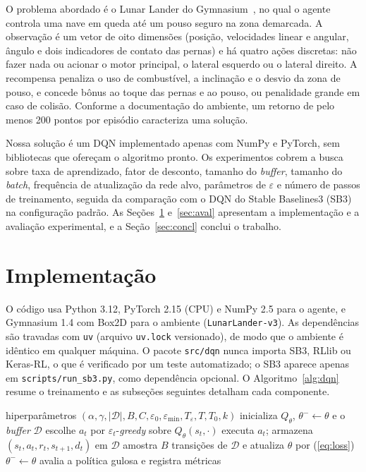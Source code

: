\documentclass[conference]{IEEEtran}
\begin{document}
O problema abordado é o Lunar Lander do Gymnasium~\cite{gymnasium}, no qual o agente controla uma nave em queda até um pouso seguro na zona demarcada. A observação é um vetor de oito dimensões (posição, velocidades linear e angular, ângulo e dois indicadores de contato das pernas) e há quatro ações discretas: não fazer nada ou acionar o motor principal, o lateral esquerdo ou o lateral direito. A recompensa penaliza o uso de combustível, a inclinação e o desvio da zona de pouso, e concede bônus ao toque das pernas e ao pouso, ou penalidade grande em caso de colisão. Conforme a documentação do ambiente, um retorno de pelo menos 200 pontos por episódio caracteriza uma solução.

Nossa solução é um DQN implementado apenas com NumPy e PyTorch, sem bibliotecas que ofereçam o algoritmo pronto. Os experimentos cobrem a busca sobre taxa de aprendizado, fator de desconto, tamanho do \textit{buffer}, tamanho do \textit{batch}, frequência de atualização da rede alvo, parâmetros de $\varepsilon$ e número de passos de treinamento, seguida da comparação com o DQN do Stable Baselines3 (SB3)~\cite{sb3} na configuração padrão. As Seções~\ref{sec:impl} e~\ref{sec:aval} apresentam a implementação e a avaliação experimental, e a Seção~\ref{sec:concl} conclui o trabalho.

\section{Implementação}
\label{sec:impl}
O código usa Python 3.12, PyTorch 2.15 (CPU) e NumPy 2.5 para o agente, e Gymnasium 1.4 com Box2D para o ambiente (\texttt{LunarLander-v3}). As dependências são travadas com \texttt{uv} (arquivo \texttt{uv.lock} versionado), de modo que o ambiente é idêntico em qualquer máquina. O pacote \texttt{src/dqn} nunca importa SB3, RLlib ou Keras-RL, o que é verificado por um teste automatizado; o SB3 aparece apenas em \texttt{scripts/run\_sb3.py}, como dependência opcional. O Algoritmo~\ref{alg:dqn} resume o treinamento e as subseções seguintes detalham cada componente.

\begin{algorithm}[t]
\caption{DQN implementado (resumo)}
\label{alg:dqn}
\small
\begin{algorithmic}[1]
\Require hiperparâmetros $(\alpha,\gamma,|\mathcal{D}|,B,C,\varepsilon_0,\varepsilon_{\min},T_\varepsilon,T,T_0,k)$
\State inicializa $Q_\theta$, $\theta^-\!\leftarrow\!\theta$ e o \textit{buffer} $\mathcal{D}$
  \State escolhe $a_t$ por $\varepsilon_t$-\textit{greedy} sobre $Q_\theta(s_t,\cdot)$
  \State executa $a_t$; armazena $(s_t,a_t,r_t,s_{t+1},d_t)$ em $\mathcal{D}$
    \State amostra $B$ transições de $\mathcal{D}$ e atualiza $\theta$ por (\ref{eq:loss})
  \EndIf
   \State $\theta^-\!\leftarrow\!\theta$ \EndIf
   \State avalia a política gulosa e registra métricas \EndIf
\EndFor
\end{algorithmic}
\end{algorithm}
\end{document}
